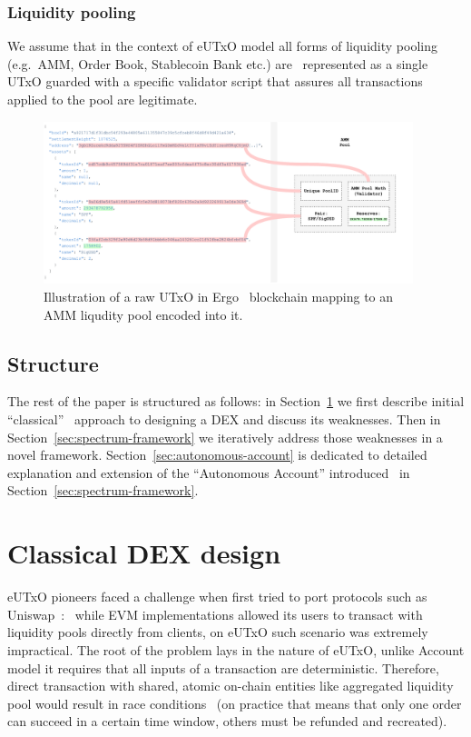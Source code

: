 \documentclass[11pt]{article}
\begin{document}
\begin{sloppypar}
        \subsubsection{Liquidity pooling}
        We assume that in the context of eUTxO model all forms of liquidity pooling (e.g.\ AMM, Order Book, Stablecoin Bank etc.) are \
        represented as a single UTxO guarded with a specific validator script that assures all transactions applied to the pool are legitimate.

        \begin{figure}[h]
            \centering
            \includegraphics[width=0.96\textwidth]{amm-utxo}
            \caption{Illustration of a raw UTxO in Ergo~\cite{ergo2019wp} blockchain mapping to an AMM liqudity pool encoded into it.}
            \label{fig:figure}
        \end{figure}

        \subsection{Structure}\label{subsec:structure}
        The rest of the paper is structured as follows: in Section~\ref{sec:classical-dex-design} we first describe initial \enquote{classical} \
        approach to designing a DEX and discuss its weaknesses.
        Then in Section~\ref{sec:spectrum-framework} we iteratively address those weaknesses in a novel framework.
        Section~\ref{sec:autonomous-account} is dedicated to detailed explanation and extension of the \enquote{Autonomous Account} introduced \
        in Section~\ref{sec:spectrum-framework}.


        \section{Classical DEX design}\label{sec:classical-dex-design}
        eUTxO pioneers faced a challenge when first tried to port protocols such as Uniswap~\cite{uniswap2020evm}: \
        while EVM implementations allowed its users to transact with liquidity pools directly from clients, on eUTxO such scenario was extremely impractical.
        The root of the problem lays in the nature of eUTxO, unlike Account model it requires that all inputs of a transaction are deterministic.
        Therefore, direct transaction with shared, atomic on-chain entities like aggregated liquidity pool would result in race conditions \
        (on practice that means that only one order can succeed in a certain time window, others must be refunded and recreated).


\end{sloppypar}
\end{document}
